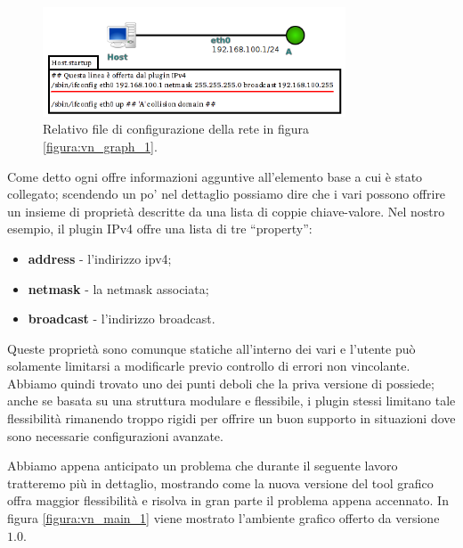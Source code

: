 \begin{figure}[!ht]
	\centering
	\includegraphics[width=9cm]{images/visualnetkit_graph_2.png}
	\caption{Relativo file di configurazione della rete in figura \ref{figura:vn_graph_1}.}
	\label{figura:vn_graph_2}
\end{figure}

Come detto ogni \plugin{} offre informazioni agguntive all'elemento base a cui è stato collegato; scendendo un po' nel dettaglio possiamo dire che i vari \plugin{} possono offrire un insieme di proprietà descritte da una lista di coppie chiave-valore. Nel nostro esempio, il plugin IPv4 offre una lista di tre ``property'':
\begin{itemize}
	\item \textbf{address} - l'indirizzo ipv4;
	\item \textbf{netmask} - la netmask associata;
	\item \textbf{broadcast} - l'indirizzo broadcast.
\end{itemize}

Queste proprietà sono comunque statiche all'interno dei vari \plugin{} e l'utente può solamente limitarsi a modificarle previo controllo di errori non vincolante. Abbiamo quindi trovato uno dei punti deboli che la priva versione di \visualnetkit{} possiede; anche se basata su una struttura modulare e flessibile, i plugin stessi limitano tale flessibilità rimanendo troppo rigidi per offrire un buon supporto in situazioni dove sono necessarie configurazioni avanzate.

Abbiamo appena anticipato un problema che durante il seguente lavoro tratteremo più in dettaglio, mostrando come la nuova versione del tool grafico offra maggior flessibilità e risolva in gran parte il problema appena accennato. In figura \ref{figura:vn_main_1} viene mostrato l'ambiente grafico offerto da \visualnetkit{} versione $1.0$.


